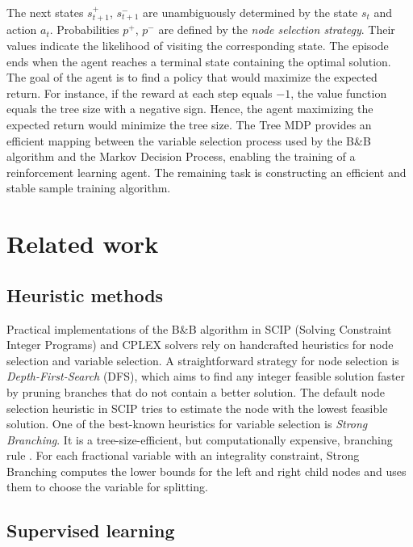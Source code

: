 \documentclass[preprint,12pt]{elsarticle} %
\theoremstyle{plain}
\theoremstyle{definition}
\theoremstyle{remark}
\begin{document}
The next states $s_{t+1}^+$, $s_{t+1}^-$ are unambiguously determined by the state $s_t$ and action $a_t$. Probabilities  $p^+$, $p^-$ are defined by the \emph{node selection strategy}. Their values indicate the likelihood of visiting the corresponding state. The episode ends when the agent reaches a terminal state containing the optimal solution. The goal of the agent is to find a policy that would maximize the expected return. For instance, if the reward at each step equals $-1$, the value function equals the tree size with a negative sign. Hence, the agent maximizing the expected return would minimize the tree size. The Tree MDP provides an efficient mapping between the variable selection process used by the B\&B algorithm and the Markov Decision Process, enabling the training of a reinforcement learning agent. The remaining task is constructing an efficient and stable sample training algorithm. 

\section{Related work}\label{sec:related}

\subsection{Heuristic methods}

Practical implementations of the B\&B algorithm in SCIP (Solving Constraint Integer Programs) \cite{scip} and CPLEX \cite{cplex2009v12} solvers rely on handcrafted heuristics for node selection and variable selection. A straightforward strategy for node selection is \emph{Depth-First-Search} (DFS), which aims to find any integer feasible solution faster by pruning branches that do not contain a better solution. The default node selection heuristic in SCIP tries to estimate the node with the lowest feasible solution. One of the best-known heuristics for variable selection is \emph{Strong Branching}. It is a tree-size-efficient, but computationally expensive, branching rule \cite{achterberg_constraint_2007}. For each fractional variable with an integrality constraint, Strong Branching computes the lower bounds for the left and right child nodes and uses them to choose the variable for splitting.

\subsection{Supervised learning}
\end{document}
